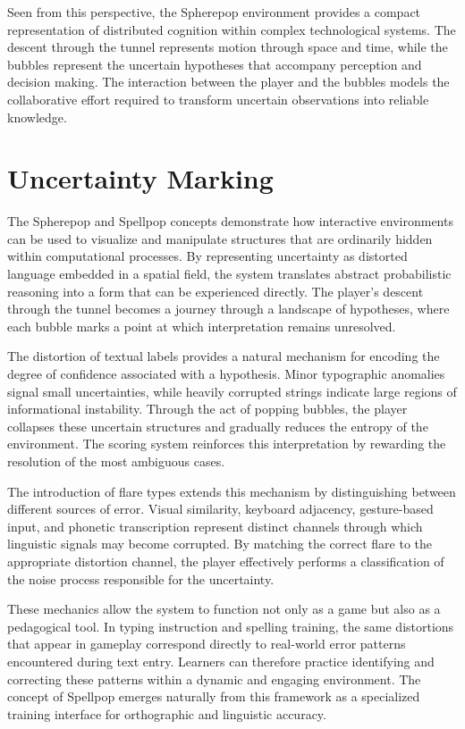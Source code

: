 \documentclass[11pt]{article}
\begin{document}
Seen from this perspective, the Spherepop environment provides a compact representation of distributed cognition within complex technological systems. The descent through the tunnel represents motion through space and time, while the bubbles represent the uncertain hypotheses that accompany perception and decision making. The interaction between the player and the bubbles models the collaborative effort required to transform uncertain observations into reliable knowledge.

\section{Uncertainty Marking}

The Spherepop and Spellpop concepts demonstrate how interactive environments can be used to visualize and manipulate structures that are ordinarily hidden within computational processes. By representing uncertainty as distorted language embedded in a spatial field, the system translates abstract probabilistic reasoning into a form that can be experienced directly. The player’s descent through the tunnel becomes a journey through a landscape of hypotheses, where each bubble marks a point at which interpretation remains unresolved.

The distortion of textual labels provides a natural mechanism for encoding the degree of confidence associated with a hypothesis. Minor typographic anomalies signal small uncertainties, while heavily corrupted strings indicate large regions of informational instability. Through the act of popping bubbles, the player collapses these uncertain structures and gradually reduces the entropy of the environment. The scoring system reinforces this interpretation by rewarding the resolution of the most ambiguous cases.

The introduction of flare types extends this mechanism by distinguishing between different sources of error. Visual similarity, keyboard adjacency, gesture-based input, and phonetic transcription represent distinct channels through which linguistic signals may become corrupted. By matching the correct flare to the appropriate distortion channel, the player effectively performs a classification of the noise process responsible for the uncertainty.

These mechanics allow the system to function not only as a game but also as a pedagogical tool. In typing instruction and spelling training, the same distortions that appear in gameplay correspond directly to real-world error patterns encountered during text entry. Learners can therefore practice identifying and correcting these patterns within a dynamic and engaging environment. The concept of Spellpop emerges naturally from this framework as a specialized training interface for orthographic and linguistic accuracy.
\end{document}
